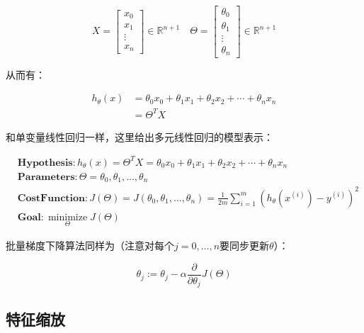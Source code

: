 \documentclass[12pt, a4paper]{article}
\begin{document}
\begin{equation*}
    X=\left[
        \begin{matrix}
            x_0    \\
            x_1    \\
            \vdots \\
            x_n
        \end{matrix}
        \right]\in\mathbb{R}^{n+1}\quad
    \Theta=\left[
        \begin{matrix}
            \theta_0 \\
            \theta_1 \\
            \vdots   \\
            \theta_n
        \end{matrix}
        \right]\in\mathbb{R}^{n+1}
\end{equation*}

从而有：

\begin{align*}
    h_\theta(x) & =\theta_0x_0 + \theta_1x_1+ \theta_2x_2+\cdots+\theta_nx_n \\
                & =\Theta^TX
\end{align*}

和单变量线性回归一样，这里给出多元线性回归的模型表示：

\begin{align*}
     & \mathbf{Hypothesis}: h_\theta(x)=\Theta^TX=\theta_0x_0 + \theta_1x_1 + \theta_2x_2+\cdots+\theta_nx_n                          \\
     & \mathbf{Parameters}:\Theta=\theta_0,\theta_1,\dots,\theta_n                                                                    \\
     & \mathbf{Cost Function}:J(\Theta)=J(\theta_0,\theta_1,\dots,\theta_n) = \frac{1}{2m}\sum_{i=1}^{m}(h_\theta(x^{(i)})-y^{(i)})^2 \\
     & \mathbf{Goal}: \mathop{minimize}\limits_{\Theta}J(\Theta)
\end{align*}

批量梯度下降算法同样为（注意对每个$j=0,\dots,n$要同步更新$\theta$）：

\begin{equation*}
    \theta_j:=\theta_j-\alpha\frac{\partial}{\partial\theta_j}J(\Theta)
\end{equation*}


\subsection{特征缩放}
\end{document}
